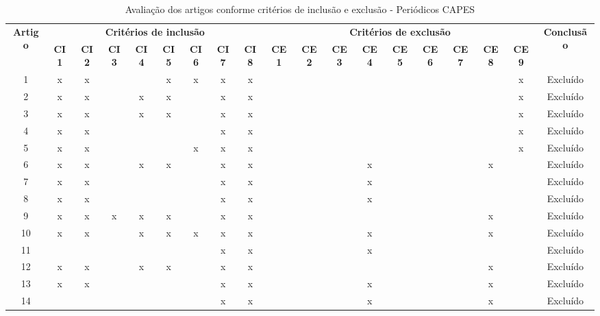 \documentclass[
	12pt,				%
	oneside,			%
	a4paper,			%
	english,			%
	brazil				%
	]{abntex2ppgsi}
\begin{document}
\begin{apendicesenv}
\begin{table}[H]
\centering
\caption{Avaliação dos artigos conforme critérios de inclusão e exclusão - Periódicos CAPES}
\label{tab:crit_IncExc_PC}
\setlength{\tabcolsep}{1.5pt} %
\footnotesize %
\begin{tabular}{c | c c c c c c c c | c c c c c c c c c | c}
\toprule
    \multirow{2}{*}{\textbf{Artigo}} & 
    \multicolumn{8}{c|}{\textbf{Critérios de inclusão}} &
    \multicolumn{9}{c|}{\textbf{Critérios de exclusão}} &
    \multirow{2}{*}{\textbf{Conclusão}} \\ 
    \cline{2-18}
 & \tiny\textbf{CI1} & \tiny\textbf{CI2} & \tiny\textbf{CI3} & \tiny\textbf{CI4} & \tiny\textbf{CI5} & \tiny\textbf{CI6} & \tiny\textbf{CI7} & \tiny\textbf{CI8} & \tiny\textbf{CE1} & \tiny\textbf{CE2} & \tiny\textbf{CE3} & \tiny\textbf{CE4} & \tiny\textbf{CE5} & \tiny\textbf{CE6} & \tiny\textbf{CE7} & \tiny\textbf{CE8} & \tiny\textbf{CE9} & \\
\midrule
 1 & x & x &   &   & x & x & x & x &   &   &   &   &   &   &   &   & x & Excluído \\
 2 & x & x &   & x & x &   & x & x &   &   &   &   &   &   &   &   & x & Excluído \\
 3 & x & x &   & x & x &   & x & x &   &   &   &   &   &   &   &   & x & Excluído \\
 4 & x & x &   &   &   &   & x & x &   &   &   &   &   &   &   &   & x & Excluído \\
 5 & x & x &   &   &   & x & x & x &   &   &   &   &   &   &   &   & x & Excluído \\
 6 & x & x &   & x & x &   & x & x &   &   &   & x &   &   &   & x &   & Excluído \\
 7 & x & x &   &   &   &   & x & x &   &   &   & x &   &   &   &   &   & Excluído \\
 8 & x & x &   &   &   &   & x & x &   &   &   & x &   &   &   &   &   & Excluído \\
 9 & x & x & x & x & x &   & x & x &   &   &   &   &   &   &   & x &   & Excluído \\
10 & x & x &   & x & x & x & x & x &   &   &   & x &   &   &   & x &   & Excluído \\
11 &   &   &   &   &   &   & x & x &   &   &   & x &   &   &   &   &   & Excluído \\
12 & x & x &   & x & x &   & x & x &   &   &   &   &   &   &   & x &   & Excluído \\
13 & x & x &   &   &   &   & x & x &   &   &   & x &   &   &   & x &   & Excluído \\
14 &   &   &   &   &   &   & x & x &   &   &   & x &   &   &   & x &   & Excluído \\
\bottomrule
\end{tabular}
\end{table}



\end{apendicesenv}
\end{document}
